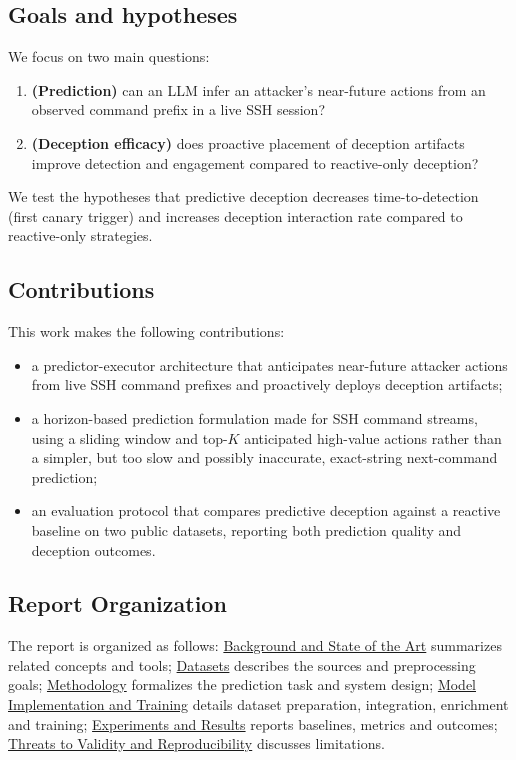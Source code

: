 \documentclass[10pt,a4paper,twocolumn]{article}
\begin{document}
\subsection{Goals and hypotheses}
We focus on two main questions:
\begin{enumerate}
    \item \textbf{(Prediction)} can an LLM infer an attacker's near-future actions from an observed command prefix in a live SSH session?
    \item \textbf{(Deception efficacy)} does proactive placement of deception artifacts improve detection and engagement compared to reactive-only deception?
\end{enumerate}
We test the hypotheses that predictive deception decreases time-to-detection (first canary trigger) and increases deception interaction rate compared to reactive-only strategies.

\subsection{Contributions}
This work makes the following contributions:
\begin{itemize}
    \item a predictor-executor architecture that anticipates near-future attacker actions from live SSH command prefixes and proactively deploys deception artifacts;
    \item a horizon-based prediction formulation made for SSH command streams, using a sliding window and top-$K$ anticipated high-value actions rather than a simpler, but too slow and possibly inaccurate, exact-string next-command prediction;
    \item an evaluation protocol that compares predictive deception against a reactive baseline on two public datasets, reporting both prediction quality and deception outcomes.
\end{itemize}

\subsection{Report Organization}
The report is organized as follows: \hyperref[sec:state-of-the-art]{Background and State of the Art} summarizes related concepts and tools; \hyperref[sec:datasets]{Datasets} describes the sources and preprocessing goals; \hyperref[sec:methodology]{Methodology} formalizes the prediction task and system design; \hyperref[sec:model-impl-training]{Model Implementation and Training} details dataset preparation, integration, enrichment and training; \hyperref[sec:experiments-results]{Experiments and Results} reports baselines, metrics and outcomes; \hyperref[sec:threats-validity]{Threats to Validity and Reproducibility} discusses limitations.
\end{document}
